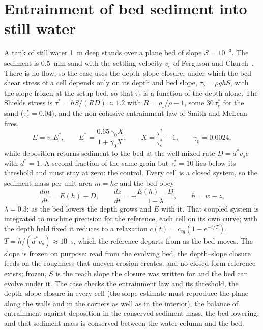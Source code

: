
\section{Entrainment of bed sediment into still water}

A tank of still water 1~m deep stands over a plane bed of slope
$S = 10^{-3}$. The sediment is 0.5~mm sand with the settling velocity $v_s$
of Ferguson and Church~\cite{FergusonChurch2004}. There is no flow, so the
case uses the depth--slope closure, under which the bed shear stress of a
cell depends only on its depth and bed slope, $\tau_b = \rho g h S$, with the
slope frozen at the setup bed, so that $\tau_b$ is a function of the depth
alone. The Shields stress is $\tau^{*} = hS/(RD) \approx 1.2$ with
$R = \rho_s/\rho - 1$, some $30\,\tau_c^{*}$ for the sand
($\tau_c^{*} = 0.04$), and the non-cohesive entrainment law of Smith and
McLean fires,
\begin{equation}
E = v_s E^{*}, \qquad
E^{*} = \frac{0.65\,\gamma_0 X}{1 + \gamma_0 X}, \qquad
X = \frac{\tau^{*}}{\tau_c^{*}} - 1, \qquad \gamma_0 = 0.0024 ,
\end{equation}
while deposition returns sediment to the bed at the well-mixed rate
$D = d^{*} v_s c$ with $d^{*} = 1$. A second fraction of the same grain but
$\tau_c^{*} = 10$ lies below its threshold and must stay at zero: the
control. Every cell is a closed system, so the sediment mass per unit area
$m = hc$ and the bed obey
\begin{equation}
\frac{dm}{dt} = E(h) - D, \qquad \frac{dz}{dt} = -\frac{E(h) - D}{1-\lambda},
\qquad h = w - z ,
\end{equation}
$\lambda = 0.3$: as the bed lowers the depth grows and $E$ with it. That
coupled system is integrated to machine precision for the reference, each
cell on its own curve; with the depth held fixed it reduces to a relaxation
$c(t) = c_{eq}(1 - e^{-t/T})$, $T = h/(d^{*}v_s) \approx 10$~s, which the
reference departs from as the bed moves. The slope is frozen on purpose:
read from the evolving bed, the depth--slope closure feeds on the roughness
that uneven erosion creates, and no closed-form reference exists; frozen,
$S$ is the reach slope the closure was written for and the bed can evolve
under it. The case checks the entrainment law and its threshold, the
depth--slope closure in every cell (the slope estimate must reproduce the
plane along the walls and in the corners as well as in the interior), the
balance of entrainment against deposition in the conserved sediment mass,
the bed lowering, and that sediment mass is conserved between the water
column and the bed.

